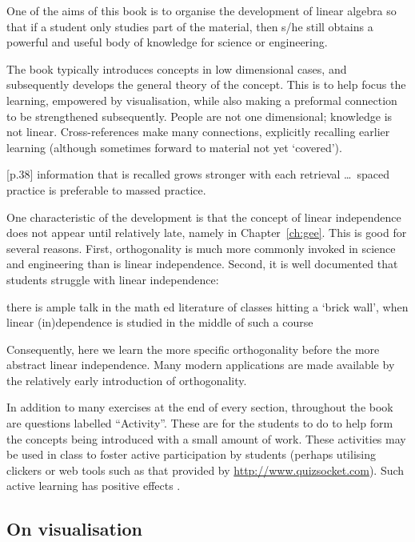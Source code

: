 One of the aims of this book is to organise the development of linear algebra so that if a student only studies part of the material, then s/he still obtains a powerful and useful body of knowledge for science or engineering.

The book typically introduces concepts in low dimensional cases, and subsequently develops the general theory of the concept.  
This is to help focus the learning, empowered by visualisation, while also making a preformal connection to be strengthened subsequently.
People are not one dimensional; knowledge is not linear.
Cross-references make many connections, explicitly recalling earlier learning (although sometimes forward to material not yet `covered').
\begin{quoted}{\cite{Halpern2003} [p.38]}
information that is recalled grows stronger with each retrieval \ldots\ spaced practice is preferable to massed practice.
\end{quoted}

One characteristic of the development is that the concept of linear independence does not appear until relatively late, namely in Chapter~\ref{ch:gee}.
This is good for several reasons.
First, orthogonality is much more commonly invoked in science and engineering than is linear independence.
Second, it is well documented that students struggle with linear independence:
\begin{quoted}{\cite{Uhlig02}}
there is ample talk in the math ed literature of classes hitting a `brick wall', when linear (in)dependence is studied in the middle of such a course
\end{quoted}
Consequently, here we learn the more specific orthogonality before the more abstract linear independence.
Many modern applications are made available by the relatively early introduction of orthogonality.

In addition to many exercises at the end of every section, throughout the book are questions labelled ``Activity''.
These are for the students to do to help form the concepts being introduced with a small amount of work.
These activities may be used in class to foster active participation by students (perhaps utilising clickers or web tools such as that provided by \url{http://www.quizsocket.com}).
Such active learning has positive effects \cite[]{ED498555}.




\subsection*{On visualisation}

